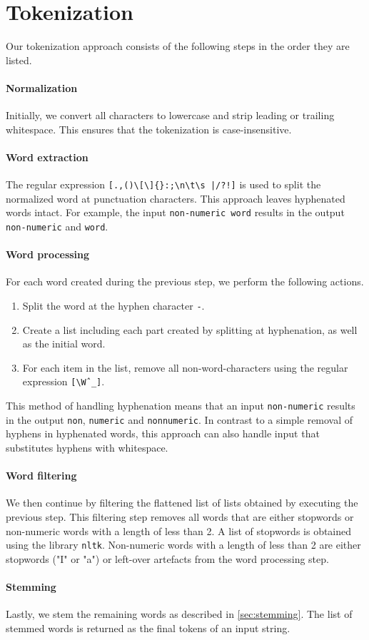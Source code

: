 \section{Tokenization}
\label{sec:tokenization}

Our tokenization approach consists of the following steps in the order they are listed.

\paragraph{Normalization}
Initially, we convert all characters to lowercase and strip leading or trailing whitespace.
This ensures that the tokenization is case-insensitive.

\paragraph{Word extraction}
The regular expression \verb=[.,()\[\]{}:;\n\t\s |/?!]= is used to split the normalized word at punctuation characters.
This approach leaves hyphenated words intact.
For example, the input \verb|non-numeric word| results in the output \verb|non-numeric| and \verb|word|.

\paragraph{Word processing}
For each word created during the previous step, we perform the following actions.

\begin{enumerate}
  \item Split the word at the hyphen character \verb|-|.
  \item Create a list including each part created by splitting at hyphenation, as well as the initial word.
  \item For each item in the list, remove all non-word-characters using the regular expression \verb|[\Wˆ_]|.
\end{enumerate}

This method of handling hyphenation means that an input \verb|non-numeric| results in the output \verb|non|, \verb|numeric| and \verb|nonnumeric|.
In contrast to a simple removal of hyphens in hyphenated words, this approach can also handle input that substitutes hyphens with whitespace.

\paragraph{Word filtering}
We then continue by filtering the flattened list of lists obtained by executing the previous step.
This filtering step removes all words that are either stopwords or non-numeric words with a length of less than 2.
A list of stopwords is obtained using the library \verb|nltk|.
Non-numeric words with a length of less than 2 are either stopwords ("I" or "a") or left-over artefacts from the word processing step.

\paragraph{Stemming}
Lastly, we stem the remaining words as described in \autoref{sec:stemming}.
The list of stemmed words is returned as the final tokens of an input string.




